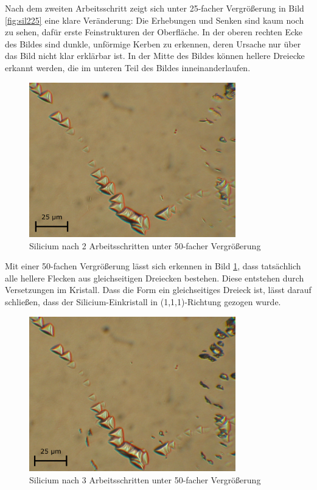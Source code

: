 \documentclass[german, %
parskip=full, %
bibliography=totoc, %
]{scrartcl}
\begin{document}
Nach dem zweiten Arbeitsschritt zeigt sich unter 25-facher Vergrößerung in Bild \ref{fig:sil225} eine klare Veränderung: Die Erhebungen und Senken sind kaum noch zu sehen, dafür erste Feinstrukturen der Oberfläche. In der oberen rechten Ecke des Bildes sind dunkle, unförmige Kerben zu erkennen, deren Ursache nur über das Bild nicht klar erklärbar ist. In der Mitte des Bildes können hellere Dreiecke erkannt werden, die im unteren Teil des Bildes inneinanderlaufen. 

\begin{figure}[ht] 
  \centering
     \includegraphics[width=0.8\textwidth]{Silicium_2_50}
  \caption{Silicium nach 2 Arbeitsschritten unter 50-facher Vergrößerung}
  \label{fig:sil250}
\end{figure}

Mit einer 50-fachen Vergrößerung lässt sich erkennen in Bild \ref{fig:sil250}, dass tatsächlich alle hellere Flecken aus gleichseitigen Dreiecken bestehen. Diese entstehen durch Versetzungen im Kristall. Dass die Form ein gleichseitiges Dreieck ist, lässt darauf schließen, dass der Silicium-Einkristall in (1,1,1)-Richtung gezogen wurde.

\begin{figure}[ht] 
  \centering
     \includegraphics[width=0.8\textwidth]{Silicium_3_50}
  \caption{Silicium nach 3 Arbeitsschritten unter 50-facher Vergrößerung}
  \label{fig:sil350}
\end{figure}
\end{document}
